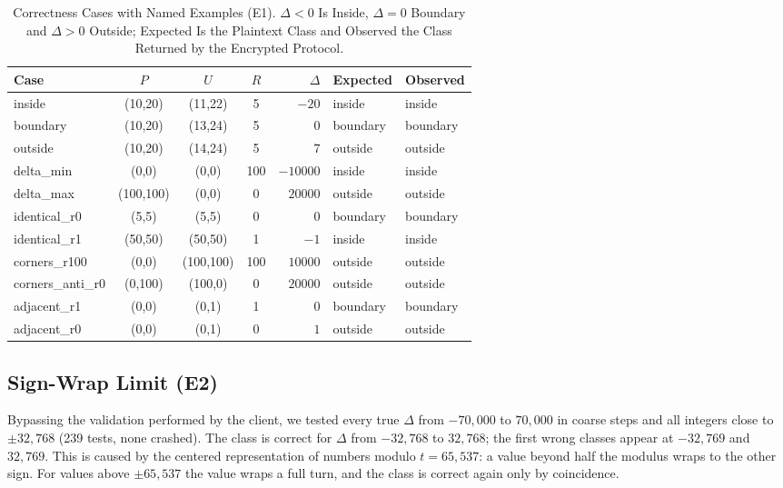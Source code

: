\documentclass[conference,letterpaper]{IEEEtran}
\begin{document}
\begin{table}[t]
\caption{Correctness Cases with Named Examples (E1). $\Delta<0$ Is Inside, $\Delta=0$ Boundary and $\Delta>0$ Outside; Expected Is the Plaintext Class and Observed the Class Returned by the Encrypted Protocol.}
\label{tab:e1}
\centering
\scriptsize
\setlength{\tabcolsep}{2.4pt}
\begin{tabular}{lcccrll}
\hline
Case & $P$ & $U$ & $R$ & $\Delta$ & Expected & Observed \\
\hline
inside & (10,20) & (11,22) & 5 & $-20$ & inside & inside \\
boundary & (10,20) & (13,24) & 5 & $0$ & boundary & boundary \\
outside & (10,20) & (14,24) & 5 & $7$ & outside & outside \\
delta\_min & (0,0) & (0,0) & 100 & $-10000$ & inside & inside \\
delta\_max & (100,100) & (0,0) & 0 & $20000$ & outside & outside \\
identical\_r0 & (5,5) & (5,5) & 0 & $0$ & boundary & boundary \\
identical\_r1 & (50,50) & (50,50) & 1 & $-1$ & inside & inside \\
corners\_r100 & (0,0) & (100,100) & 100 & $10000$ & outside & outside \\
corners\_anti\_r0 & (0,100) & (100,0) & 0 & $20000$ & outside & outside \\
adjacent\_r1 & (0,0) & (0,1) & 1 & $0$ & boundary & boundary \\
adjacent\_r0 & (0,0) & (0,1) & 0 & $1$ & outside & outside \\
\hline
\end{tabular}
\end{table}

\subsection{Sign-Wrap Limit (E2)}\label{sec:e2}
Bypassing the validation performed by the client, we tested every true $\Delta$ from $-70{,}000$ to $70{,}000$ in coarse steps and all integers close to $\pm 32{,}768$ (239 tests, none crashed). The class is correct for $\Delta$ from $-32{,}768$ to $32{,}768$; the first wrong classes appear at $-32{,}769$ and $32{,}769$. This is caused by the centered representation of numbers modulo $t = 65{,}537$: a value beyond half the modulus wraps to the other sign. For values above $\pm 65{,}537$ the value wraps a full turn, and the class is correct again only by coincidence.
\end{document}
